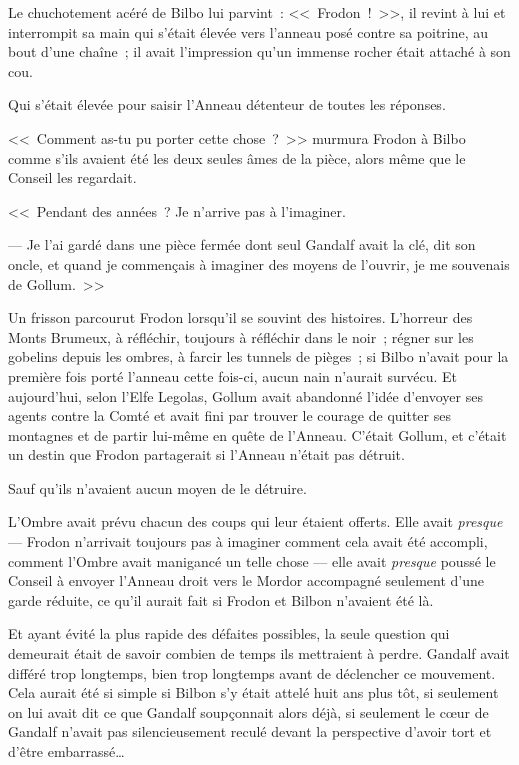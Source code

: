 Le chuchotement acéré de Bilbo lui parvint~: <<~Frodon~!~>>, il revint à lui et interrompit sa main qui s'était élevée vers l'anneau posé contre sa poitrine, au bout d'une chaîne~; il avait l'impression qu'un immense rocher était attaché à son cou.

Qui s'était élevée pour saisir l'Anneau détenteur de toutes les réponses.

<<~Comment as-tu pu porter cette chose~?~>> murmura Frodon à Bilbo comme s'ils avaient été les deux seules âmes de la pièce, alors même que le Conseil les regardait.

<<~Pendant des années~? Je n'arrive pas à l'imaginer.

--- Je l'ai gardé dans une pièce fermée dont seul Gandalf avait la clé, dit son oncle, et quand je commençais à imaginer des moyens de l'ouvrir, je me souvenais de Gollum.~>>

Un frisson parcourut Frodon lorsqu'il se souvint des histoires. L'horreur des Monts Brumeux, à réfléchir, toujours à réfléchir dans le noir~; régner sur les gobelins depuis les ombres, à farcir les tunnels de pièges~; si Bilbo n'avait pour la première fois porté l'anneau cette fois-ci, aucun nain n'aurait survécu. Et aujourd'hui, selon l'Elfe Legolas, Gollum avait abandonné l'idée d'envoyer ses agents contre la Comté et avait fini par trouver le courage de quitter ses montagnes et de partir lui-même en quête de l'Anneau. C'était Gollum, et c'était un destin que Frodon partagerait si l'Anneau n'était pas détruit.

Sauf qu'ils n'avaient aucun moyen de le détruire.

L'Ombre avait prévu chacun des coups qui leur étaient offerts. Elle avait \emph{presque} — Frodon n'arrivait toujours pas à imaginer comment cela avait été accompli, comment l'Ombre avait manigancé un telle chose — elle avait \emph{presque} poussé le Conseil à envoyer l'Anneau droit vers le Mordor accompagné seulement d'une garde réduite, ce qu'il aurait fait si Frodon et Bilbon n'avaient été là.

Et ayant évité la plus rapide des défaites possibles, la seule question qui demeurait était de savoir combien de temps ils mettraient à perdre. Gandalf avait différé trop longtemps, bien trop longtemps avant de déclencher ce mouvement. Cela aurait été si simple si Bilbon s'y était attelé huit ans plus tôt, si seulement on lui avait dit ce que Gandalf soupçonnait alors déjà, si seulement le cœur de Gandalf n'avait pas silencieusement reculé devant la perspective d'avoir tort et d'être embarrassé…

